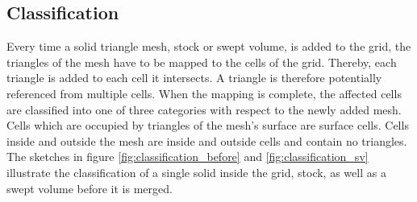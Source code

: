 \subsection{Classification}
\label{sec:classification}

Every time a solid triangle mesh, stock or swept volume, is added to the grid, the triangles of the mesh have to be mapped to the cells of the grid.
Thereby, each triangle is added to each cell it intersects.
A triangle is therefore potentially referenced from multiple cells.
When the mapping is complete, the affected cells are classified into one of three categories with respect to the newly added mesh.
Cells which are occupied by triangles of the mesh's surface are surface cells.
Cells inside and outside the mesh are inside and outside cells and contain no triangles.
The sketches in figure \ref{fig:classification_before} and \ref{fig:classification_sv} illustrate the classification of a single solid inside the grid, \ie stock, as well as a swept volume before it is merged.

